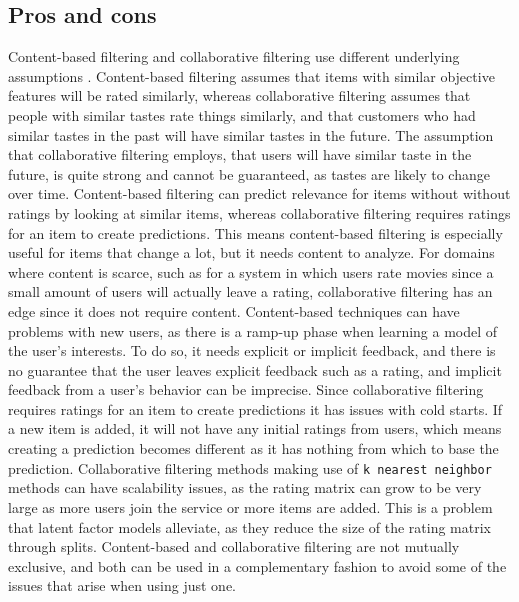 \subsection{Pros and cons}\label{sec:recommender-pros-and-cons}
Content-based filtering and collaborative filtering use different underlying assumptions \cite{CollaborativeFiltering}.
Content-based filtering assumes that items with similar objective features will be rated similarly, whereas collaborative filtering assumes that people with similar tastes rate things similarly, and that customers who had similar tastes in the past will have similar tastes in the future.
The assumption that collaborative filtering employs, that users will have similar taste in the future, is quite strong and cannot be guaranteed, as tastes are likely to change over time.
Content-based filtering can predict relevance for items without without ratings by looking at similar items, whereas collaborative filtering requires ratings for an item to create predictions.
This means content-based filtering is especially useful for items that change a lot, but it needs content to analyze.
For domains where content is scarce, such as for a system in which users rate movies since a small amount of users will actually leave a rating, collaborative filtering has an edge since it does not require content.
Content-based techniques can have problems with new users, as there is a ramp-up phase when learning a model of the user's interests.
To do so, it needs explicit or implicit feedback, and there is no guarantee that the user leaves explicit feedback such as a rating, and implicit feedback from a user's behavior can be imprecise.
Since collaborative filtering requires ratings for an item to create predictions it has issues with cold starts.
If a new item is added, it will not have any initial ratings from users, which means creating a prediction becomes different as it has nothing from which to base the prediction.
Collaborative filtering methods making use of \texttt{k nearest neighbor} methods can have scalability issues, as the rating matrix can grow to be very large as more users join the service or more items are added.
This is a problem that latent factor models alleviate, as they reduce the size of the rating matrix through splits.
Content-based and collaborative filtering are not mutually exclusive, and both can be used in a complementary fashion to avoid some of the issues that arise when using just one.
